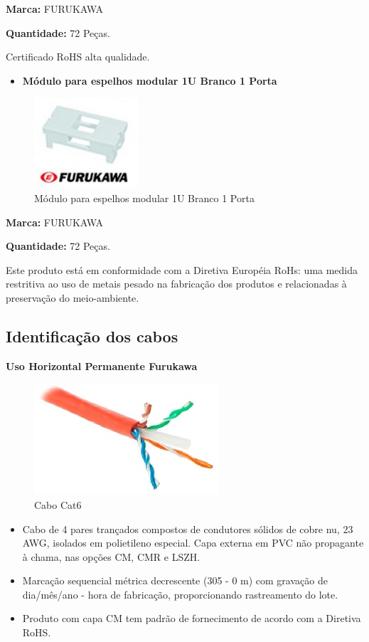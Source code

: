 \documentclass[	DIV=calc,%
							paper=a4,%
							fontsize=12pt,%
							onecolumn]{scrartcl}	 					%
\begin{document}
\textbf{Marca:} FURUKAWA 

\textbf{Quantidade:} 72 Peças.

Certificado RoHS alta qualidade.

\begin{itemize}
	\item \textbf{Módulo para espelhos modular 1U Branco 1 Porta} 
\end{itemize}

\begin{figure}
	\centering
	\caption{Módulo para espelhos modular 1U Branco 1 Porta}
	\includegraphics{espelho1}
\end{figure}

\textbf{Marca:} FURUKAWA

\textbf{Quantidade:} 72 Peças.

Este produto está em conformidade com a Diretiva Européia RoHs: uma medida restritiva ao uso de metais pesado na fabricação dos produtos e relacionadas à preservação do meio-ambiente.

\subsection{Identificação dos cabos}

\textbf{Uso Horizontal Permanente Furukawa}

\begin{figure}[!h]
	\centering
	\caption{Cabo Cat6}
	\includegraphics{cabo_cat6_1}
\end{figure}

\begin{itemize}
	\item Cabo de 4 pares trançados compostos de condutores sólidos de cobre nu, 23 AWG, isolados em polietileno especial. Capa externa em PVC não propagante à chama, nas opções CM, CMR e LSZH.
	\item Marcação sequencial métrica decrescente (305 - 0 m) com gravação de dia/mês/ano - hora de fabricação, proporcionando rastreamento do lote.
	\item Produto com capa CM tem padrão de fornecimento de acordo com a Diretiva RoHS.
\end{itemize}
\end{document}
